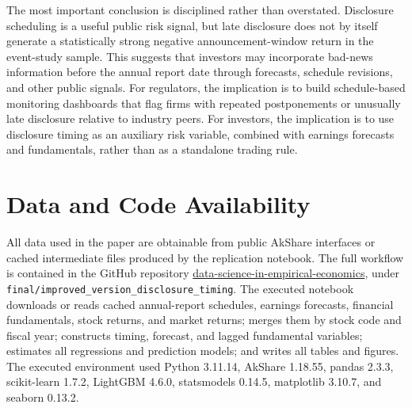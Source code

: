 \documentclass[10pt]{article}
\begin{document}
The most important conclusion is disciplined rather than overstated. Disclosure scheduling is a useful public risk signal, but late disclosure does not by itself generate a statistically strong negative announcement-window return in the event-study sample. This suggests that investors may incorporate bad-news information before the annual report date through forecasts, schedule revisions, and other public signals. For regulators, the implication is to build schedule-based monitoring dashboards that flag firms with repeated postponements or unusually late disclosure relative to industry peers. For investors, the implication is to use disclosure timing as an auxiliary risk variable, combined with earnings forecasts and fundamentals, rather than as a standalone trading rule.

\section{Data and Code Availability}

All data used in the paper are obtainable from public AkShare interfaces or cached intermediate files produced by the replication notebook. The full workflow is contained in the GitHub repository \href{https://github.com/George-hardworking/data-science-in-empirical-economics}{data-science-in-empirical-economics}, under \texttt{final/improved\_version\_disclosure\_timing}. The executed notebook downloads or reads cached annual-report schedules, earnings forecasts, financial fundamentals, stock returns, and market returns; merges them by stock code and fiscal year; constructs timing, forecast, and lagged fundamental variables; estimates all regressions and prediction models; and writes all tables and figures. The executed environment used Python 3.11.14, AkShare 1.18.55, pandas 2.3.3, scikit-learn 1.7.2, LightGBM 4.6.0, statsmodels 0.14.5, matplotlib 3.10.7, and seaborn 0.13.2.
\end{document}
